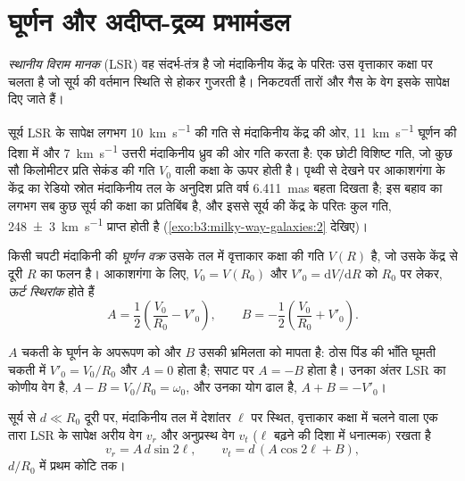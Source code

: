 \section{घूर्णन और अदीप्त-द्रव्य प्रभामंडल}\label{sec:b3:milky-way-galaxies:rotation}

\begin{definition}[स्थानीय विराम मानक]\label{def:b3:milky-way-galaxies:lsr}
\emph{स्थानीय विराम मानक} (LSR) वह संदर्भ-तंत्र है
जो मंदाकिनीय केंद्र के परितः उस वृत्ताकार कक्षा पर चलता है
जो सूर्य की वर्तमान स्थिति से होकर गुजरती है। निकटवर्ती तारों और गैस के वेग
इसके सापेक्ष दिए जाते हैं।
\end{definition}

सूर्य LSR के सापेक्ष लगभग \qty{10}{km.s^{-1}} की गति से मंदाकिनीय केंद्र की ओर,
\qty{11}{km.s^{-1}} घूर्णन की दिशा में और
\qty{7}{km.s^{-1}} उत्तरी मंदाकिनीय ध्रुव की ओर गति करता है: एक छोटी विशिष्ट गति,
जो कुछ सौ किलोमीटर प्रति सेकंड की गति $V_0$ वाली कक्षा के ऊपर होती है।
पृथ्वी से देखने पर आकाशगंगा के केंद्र का रेडियो स्रोत
मंदाकिनीय तल के अनुदिश प्रति वर्ष \qty{6.411}{mas} बहता दिखता है;
इस बहाव का लगभग सब कुछ सूर्य की कक्षा का प्रतिबिंब है, और इससे सूर्य की
केंद्र के परितः कुल गति, \qty[separate-uncertainty=true]{248 \pm 3}{km.s^{-1}}
प्राप्त होती है (\cref{exo:b3:milky-way-galaxies:2} देखिए)।

\begin{definition}[घूर्णन वक्र; ऊर्ट स्थिरांक]\label{def:b3:milky-way-galaxies:rotation-curve}
किसी चपटी मंदाकिनी की \emph{घूर्णन वक्र} उसके तल में
वृत्ताकार कक्षा की गति $V(R)$ है, जो
उसके केंद्र से दूरी $R$ का फलन है। आकाशगंगा के लिए, $V_0 = V(R_0)$ और
$V'_0 = \mathrm{d}V/\mathrm{d}R$ को $R_0$ पर लेकर, \emph{ऊर्ट
स्थिरांक} होते हैं
\[
A = \frac12\left(\frac{V_0}{R_0} - V'_0\right), \qquad
B = -\frac12\left(\frac{V_0}{R_0} + V'_0\right).
\]
\end{definition}

$A$ चकती के घूर्णन के अपरूपण को और $B$ उसकी भ्रमिलता को मापता है: ठोस पिंड की भाँति घूमती
चकती में $V'_0 = V_0/R_0$ और $A = 0$ होता है; सपाट  पर
$A = -B$ होता है। उनका अंतर LSR का कोणीय वेग है,
$A - B = V_0/R_0 = \omega_0$, और उनका योग ढाल है, $A + B = -V'_0$।

\begin{theorem}[ऊर्ट के सूत्र]\label{thm:b3:milky-way-galaxies:oort}
सूर्य से $d \ll R_0$ दूरी पर, मंदाकिनीय तल में
देशांतर $\ell$ पर स्थित, वृत्ताकार कक्षा में चलने वाला एक तारा LSR के सापेक्ष
अरीय वेग $v_r$ और अनुप्रस्थ वेग $v_t$ ($\ell$ बढ़ने की
दिशा में धनात्मक) रखता है
\[
v_r = A\,d\sin 2\ell, \qquad v_t = d\,(A\cos 2\ell + B),
\]
$d/R_0$ में प्रथम कोटि तक।
\end{theorem}

